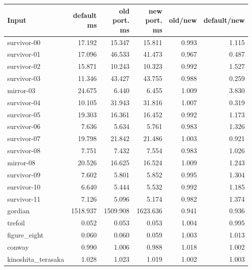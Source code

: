 \begin{center}\small
\begin{tabular}{@{}lrrrrr@{}}
\toprule
Input & default ms & old port. ms & new port. ms & old/new & default/new \\
\midrule
survivor-00 & 17.192 & 15.347 & 15.811 & 0.993 & 1.115 \\
survivor-01 & 17.096 & 46.533 & 41.473 & 0.967 & 0.487 \\
survivor-02 & 15.871 & 10.243 & 10.323 & 0.992 & 1.527 \\
survivor-03 & 11.346 & 43.427 & 43.755 & 0.988 & 0.259 \\
mirror-03 & 24.675 & 6.440 & 6.455 & 1.009 & 3.830 \\
survivor-04 & 10.105 & 31.943 & 31.816 & 1.007 & 0.319 \\
survivor-05 & 19.303 & 16.361 & 16.452 & 0.992 & 1.173 \\
survivor-06 & 7.636 & 5.634 & 5.761 & 0.983 & 1.326 \\
survivor-07 & 19.798 & 21.842 & 21.486 & 1.003 & 0.921 \\
survivor-08 & 7.751 & 7.432 & 7.554 & 0.983 & 1.026 \\
mirror-08 & 20.526 & 16.625 & 16.524 & 1.009 & 1.243 \\
survivor-09 & 7.602 & 5.801 & 5.852 & 0.995 & 1.304 \\
survivor-10 & 6.640 & 5.444 & 5.532 & 0.992 & 1.185 \\
survivor-11 & 7.126 & 5.096 & 5.174 & 0.982 & 1.374 \\
gordian & 1518.937 & 1509.908 & 1623.636 & 0.941 & 0.936 \\
trefoil & 0.052 & 0.053 & 0.053 & 1.004 & 0.995 \\
figure\_eight & 0.060 & 0.060 & 0.059 & 1.003 & 1.013 \\
conway & 0.990 & 1.006 & 0.988 & 1.018 & 1.002 \\
kinoshita\_terasaka & 1.028 & 1.023 & 1.019 & 1.002 & 1.003 \\
\bottomrule
\end{tabular}
\end{center}
